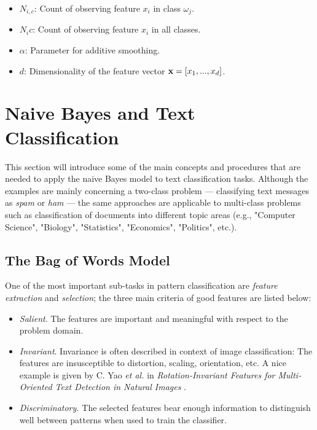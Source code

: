 \documentclass{article}
\begin{document}
\begin{itemize}

\item $N_{i,c}$: Count of observing feature $x_i$ in class $\omega_j$.
\item $N_ic$: Count of observing feature $x_i$ in all classes.
\item $\alpha$: Parameter for additive smoothing. 
\item $d$: Dimensionality of the feature vector $\textbf x = [x_1, ..., x_d]$.

\end{itemize}



 \section{Naive Bayes and Text Classification}

This section will introduce some of the main concepts and procedures that are needed to apply the naive Bayes model to text classification tasks. Although the examples are mainly concerning a two-class problem --- classifying text messages as \emph{spam} or \emph{ham} --- the same approaches are applicable to multi-class problems such as classification of documents into different topic areas (e.g., "Computer Science", "Biology", "Statistics", "Economics", "Politics", etc.).

\subsection{The Bag of Words Model}
\label{sec:the_bag_of_words_model}

One of the most important sub-tasks in pattern classification are \emph{feature extraction} and \emph{selection}; the three main criteria of good features are listed below:

\begin{itemize}
	\item \emph{Salient}. The features are important and meaningful with respect to the problem domain.
	\item \emph{Invariant}. Invariance is often described in context of image classification: The features are insusceptible to distortion, scaling, orientation, etc. A nice example is given by C. Yao \emph{et al.} in \emph{Rotation-Invariant Features for Multi-Oriented Text Detection in Natural Images} \cite{yao2013rotation}.
	\item \emph{Discriminatory.} The selected features bear enough information to distinguish well between patterns when used to train the classifier.
\end{itemize}
\end{document}
